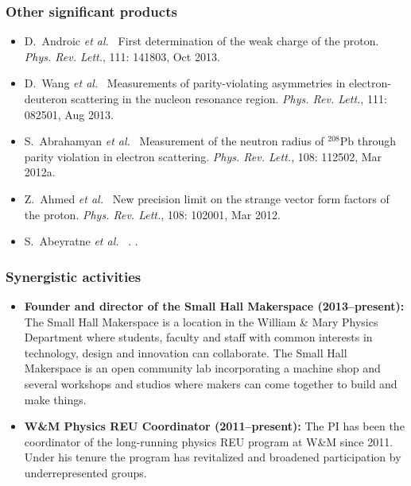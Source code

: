 \documentclass[11pt,letterpaper]{article}
\newcommand{\etal}{\textit{et al.}}
\begin{document}
\subsubsection*{Other significant products\footnotemark{}}
\begin{itemize}
 \setlength{\itemsep}{0pt}
 \setlength{\parskip}{0pt}
 \setlength{\parsep}{0pt}
 \item D.~Androic \etal~
  \newblock First determination of the weak charge of the proton.
  \newblock \emph{Phys. Rev. Lett.}, 111: 141803, Oct 2013.
 \item D.~Wang \etal~
  \newblock Measurements of parity-violating asymmetries in electron-deuteron scattering in the nucleon resonance region.
  \newblock \emph{Phys. Rev. Lett.}, 111: 082501, Aug 2013.
 \item S.~Abrahamyan \etal~
  \newblock Measurement of the neutron radius of $^{208}\mathrm{Pb}$ through parity violation in electron scattering.
  \newblock \emph{Phys. Rev. Lett.}, 108: 112502, Mar 2012a.
 \item Z.~Ahmed \etal~
  \newblock New precision limit on the strange vector form factors of the proton.
  \newblock \emph{Phys. Rev. Lett.}, 108: 102001, Mar 2012.
 \item S.~{Abeyratne} \etal~
  .
  . \label{eic}
\end{itemize}


\subsubsection*{Synergistic activities}
\begin{itemize}
 \setlength{\itemsep}{0pt}
 \setlength{\parskip}{0pt}
 \setlength{\parsep}{0pt}

 \item {\bf Founder and director of the Small Hall Makerspace (2013--present):} The Small Hall Makerspace is a location in the William \& Mary Physics Department where students, faculty and staff with common interests in technology, design and innovation can collaborate. The Small Hall Makerspace is an open community lab incorporating a machine shop and several workshops and studios where makers can come together to build and make things.
 
 \item {\bf W\&M Physics REU Coordinator (2011--present):} The PI has been the coordinator of the long-running physics REU program at W\&M since 2011. Under his tenure the program has revitalized and broadened participation by underrepresented groups.

\end{itemize}
\end{document}

